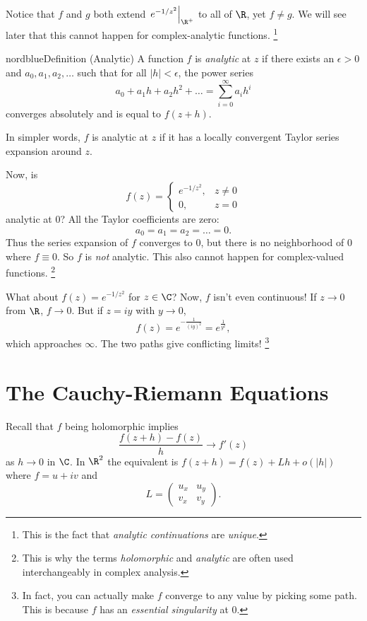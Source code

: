 Notice that $f$ and $g$ both extend
$\left.e^{-1 / z^2}\right\rvert_{\R^+}$ to all of $\R$,
yet $f \ne g$. We will see later that this cannot
happen for complex-analytic functions.
\footnote{This is the fact that \textit{analytic continuations} are \textit{unique}.}

\begin{mybox}{nordblue}{Definition (Analytic)}
  A function $f$ is \textit{analytic} at $z$ if there
  exists an $\epsilon > 0$ and $a_0, a_1, a_2, \dots$
  such that for all $|h| < \epsilon$, the power series
  \[
  a_0 + a_1 h + a_2 h^2 + \dots
  = \sum_{i = 0}^{\infty} a_i h^i
  \] 
  converges absolutely and is equal to $f(z + h)$.
\end{mybox}

In simpler words, $f$ is analytic at $z$ if it has a
locally convergent Taylor series expansion around $z$.

Now, is
\[
f(z) =
\begin{cases}
  e^{-1 / z^2}, & z \neq 0 \\
  0, & z = 0
\end{cases}
\] 
analytic at $0$? All the Taylor coefficients
are zero:
\[
  a_0 = a_1 = a_2 = \dots = 0
.\]
Thus the series expansion of $f$ converges to $0$, but
there is no neighborhood of $0$ where $f \equiv 0$.
So $f$ is \textit{not} analytic. This also cannot
happen for complex-valued functions.
\footnote{This is why the terms \textit{holomorphic} and
\textit{analytic} are often used interchangeably in
  complex analysis.}

What about $f(z) = e^{-1 / z^2}$ for $z \in \C$?
Now, $f$ isn't even continuous! If $z \to 0$
from $\R$, $f \to 0$. But if $z = iy$ with $y \to 0$,
\[f(z) = e^{-\frac{1}{(iy)^2}} = e^{\frac{1}{y^2}},\]
which approaches $\infty$. The two paths give conflicting
limits!
\footnote{In fact, you can actually make $f$ converge to
  any value by picking some path. This is because $f$
  has an \textit{essential singularity} at $0$.}

\section{The Cauchy-Riemann Equations}
Recall that $f$ being holomorphic implies
\[
  \frac{f(z + h) - f(z)}{h} \to f'(z)
\] 
as $h \to 0$ in $\C$. In $\R^2$ the equivalent is
$f(z + h) = f(z) + Lh + o(|h|)$ where $f = u + iv$ and
\[
L =
\left(\begin{matrix}
  u_x & u_y \\
  v_x & v_y
\end{matrix}\right)
.\] 

